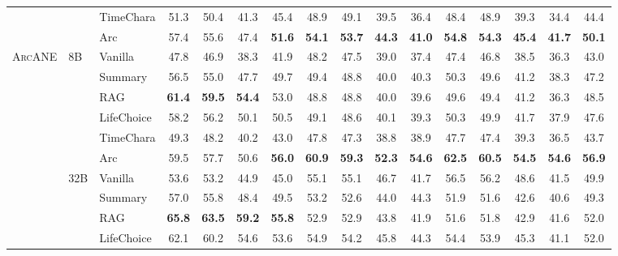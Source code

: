 \documentclass{llmxive}
\providecommand{\ours}{\textsc{ArcANE}}
\begin{document}
\begin{table}[!htbp]
\begin{tabular}{lllccccccccccccc}
 &  & TimeChara & 51.3 & 50.4 & 41.3 & 45.4 & 48.9 & 49.1 & 39.5 & 36.4 & 48.4 & 48.9 & 39.3 & 34.4 & 44.4 \\
 &  & \cellcolor{yellow!15} Arc & \cellcolor{yellow!15} 57.4 & \cellcolor{yellow!15} 55.6 & \cellcolor{yellow!15} 47.4 & \cellcolor{yellow!15} \textbf{51.6} & \cellcolor{yellow!15} \textbf{54.1} & \cellcolor{yellow!15} \textbf{53.7} & \cellcolor{yellow!15} \textbf{44.3} & \cellcolor{yellow!15} \textbf{41.0} & \cellcolor{yellow!15} \textbf{54.8} & \cellcolor{yellow!15} \textbf{54.3} & \cellcolor{yellow!15} \textbf{45.4} & \cellcolor{yellow!15} \textbf{41.7} & \cellcolor{yellow!15} \textbf{50.1} \\
\midrule
\multirow[t]{12}{*}{\ours} & \multirow[t]{6}{*}{8B} & Vanilla & 47.8 & 46.9 & 38.3 & 41.9 & 48.2 & 47.5 & 39.0 & 37.4 & 47.4 & 46.8 & 38.5 & 36.3 & 43.0 \\
 &  & Summary & 56.5 & 55.0 & 47.7 & 49.7 & 49.4 & 48.8 & 40.0 & 40.3 & 50.3 & 49.6 & 41.2 & 38.3 & 47.2 \\
 &  & RAG & \textbf{61.4} & \textbf{59.5} & \textbf{54.4} & 53.0 & 48.8 & 48.8 & 40.0 & 39.6 & 49.6 & 49.4 & 41.2 & 36.3 & 48.5 \\
 &  & LifeChoice & 58.2 & 56.2 & 50.1 & 50.5 & 49.1 & 48.6 & 40.1 & 39.3 & 50.3 & 49.9 & 41.7 & 37.9 & 47.6 \\
 &  & TimeChara & 49.3 & 48.2 & 40.2 & 43.0 & 47.8 & 47.3 & 38.8 & 38.9 & 47.7 & 47.4 & 39.3 & 36.5 & 43.7 \\
 &  & \cellcolor{yellow!15} Arc & \cellcolor{yellow!15} 59.5 & \cellcolor{yellow!15} 57.7 & \cellcolor{yellow!15} 50.6 & \cellcolor{yellow!15} \textbf{56.0} & \cellcolor{yellow!15} \textbf{60.9} & \cellcolor{yellow!15} \textbf{59.3} & \cellcolor{yellow!15} \textbf{52.3} & \cellcolor{yellow!15} \textbf{54.6} & \cellcolor{yellow!15} \textbf{62.5} & \cellcolor{yellow!15} \textbf{60.5} & \cellcolor{yellow!15} \textbf{54.5} & \cellcolor{yellow!15} \textbf{54.6} & \cellcolor{yellow!15} \textbf{56.9} \\
\cmidrule(l){2-16}
 & \multirow[t]{6}{*}{32B} & Vanilla & 53.6 & 53.2 & 44.9 & 45.0 & 55.1 & 55.1 & 46.7 & 41.7 & 56.5 & 56.2 & 48.6 & 41.5 & 49.9 \\
 &  & Summary & 57.0 & 55.8 & 48.4 & 49.5 & 53.2 & 52.6 & 44.0 & 44.3 & 51.9 & 51.6 & 42.6 & 40.6 & 49.3 \\
 &  & RAG & \textbf{65.8} & \textbf{63.5} & \textbf{59.2} & \textbf{55.8} & 52.9 & 52.9 & 43.8 & 41.9 & 51.6 & 51.8 & 42.9 & 41.6 & 52.0 \\
 &  & LifeChoice & 62.1 & 60.2 & 54.6 & 53.6 & 54.9 & 54.2 & 45.8 & 44.3 & 54.4 & 53.9 & 45.3 & 41.1 & 52.0 \\

\end{tabular}
\end{table}
\end{document}

